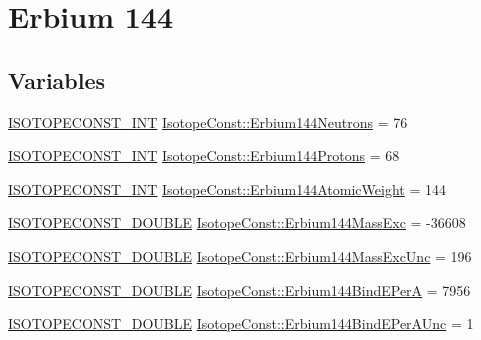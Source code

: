 \hypertarget{group___isotope_const-_erbium-_er144}{}\section{Erbium 144}
\label{group___isotope_const-_erbium-_er144}
\subsection*{Variables}
\begin{DoxyCompactItemize}
\item 
\mbox{\hyperlink{group___isotope_const-_macros_ga5f18360b3e99483a35c32d789e62621c}{I\+S\+O\+T\+O\+P\+E\+C\+O\+N\+S\+T\+\_\+\+I\+NT}} \mbox{\hyperlink{group___isotope_const-_erbium-_er144_gaee7e6584ce831734280e20e845fe912f}{Isotope\+Const\+::\+Erbium144\+Neutrons}} = 76
\item 
\mbox{\hyperlink{group___isotope_const-_macros_ga5f18360b3e99483a35c32d789e62621c}{I\+S\+O\+T\+O\+P\+E\+C\+O\+N\+S\+T\+\_\+\+I\+NT}} \mbox{\hyperlink{group___isotope_const-_erbium-_er144_gaa94651f1fb890ec3fbeb282e7b878d66}{Isotope\+Const\+::\+Erbium144\+Protons}} = 68
\item 
\mbox{\hyperlink{group___isotope_const-_macros_ga5f18360b3e99483a35c32d789e62621c}{I\+S\+O\+T\+O\+P\+E\+C\+O\+N\+S\+T\+\_\+\+I\+NT}} \mbox{\hyperlink{group___isotope_const-_erbium-_er144_ga93f52a6017e4293dad25094dcec5c527}{Isotope\+Const\+::\+Erbium144\+Atomic\+Weight}} = 144
\item 
\mbox{\hyperlink{group___isotope_const-_macros_ga8f45a7272ce02c0b4c65c44636ed719a}{I\+S\+O\+T\+O\+P\+E\+C\+O\+N\+S\+T\+\_\+\+D\+O\+U\+B\+LE}} \mbox{\hyperlink{group___isotope_const-_erbium-_er144_ga315bd1e8ba6d91b52541673f7e6683e9}{Isotope\+Const\+::\+Erbium144\+Mass\+Exc}} = -\/36608
\item 
\mbox{\hyperlink{group___isotope_const-_macros_ga8f45a7272ce02c0b4c65c44636ed719a}{I\+S\+O\+T\+O\+P\+E\+C\+O\+N\+S\+T\+\_\+\+D\+O\+U\+B\+LE}} \mbox{\hyperlink{group___isotope_const-_erbium-_er144_ga566f8dd6094456c9c7916aef6aca8386}{Isotope\+Const\+::\+Erbium144\+Mass\+Exc\+Unc}} = 196
\item 
\mbox{\hyperlink{group___isotope_const-_macros_ga8f45a7272ce02c0b4c65c44636ed719a}{I\+S\+O\+T\+O\+P\+E\+C\+O\+N\+S\+T\+\_\+\+D\+O\+U\+B\+LE}} \mbox{\hyperlink{group___isotope_const-_erbium-_er144_gaaa9bfd9f629517569433e0ee042ddc44}{Isotope\+Const\+::\+Erbium144\+Bind\+E\+PerA}} = 7956
\item 
\mbox{\hyperlink{group___isotope_const-_macros_ga8f45a7272ce02c0b4c65c44636ed719a}{I\+S\+O\+T\+O\+P\+E\+C\+O\+N\+S\+T\+\_\+\+D\+O\+U\+B\+LE}} \mbox{\hyperlink{group___isotope_const-_erbium-_er144_ga55d1d8a24f443e0d911e0fed6e9d3e87}{Isotope\+Const\+::\+Erbium144\+Bind\+E\+Per\+A\+Unc}} = 1

\end{DoxyCompactItemize}
